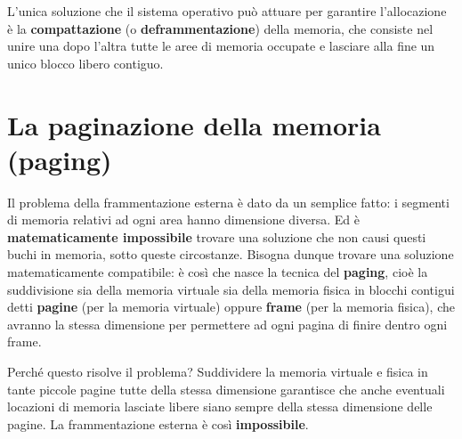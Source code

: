 \documentclass[12pt]{report}
\begin{document}
\begin{figure}[H]
	\end{figure}
	L'unica soluzione che il sistema operativo può attuare per garantire l'allocazione è la \textbf{compattazione} (o \textbf{deframmentazione}) della memoria, che consiste nel unire una dopo l'altra tutte le aree di memoria occupate e lasciare alla fine un unico blocco libero contiguo.
	
	\section{La paginazione della memoria (paging)}
	\label{sez:paging}
	Il problema della frammentazione esterna è dato da un semplice fatto: i segmenti di memoria relativi ad ogni area hanno dimensione diversa. Ed è \textbf{matematicamente impossibile} trovare una soluzione che non causi questi buchi in memoria, sotto queste circostanze. Bisogna dunque trovare una soluzione matematicamente compatibile: è così che nasce la tecnica del \textbf{paging}, cioè la suddivisione sia della memoria virtuale sia della memoria fisica in blocchi contigui detti \textbf{pagine} (per la memoria virtuale) oppure \textbf{frame} (per la memoria fisica), che avranno la stessa dimensione per permettere ad ogni pagina di finire dentro ogni frame.
	
	\begin{osservazione}{Perché questo risolve il problema?}{}
		Suddividere la memoria virtuale e fisica in tante piccole pagine tutte della stessa dimensione garantisce che anche eventuali locazioni di memoria lasciate libere siano sempre della stessa dimensione delle pagine. La frammentazione esterna è così \textbf{impossibile}.
	\end{osservazione}
	
\end{document}
